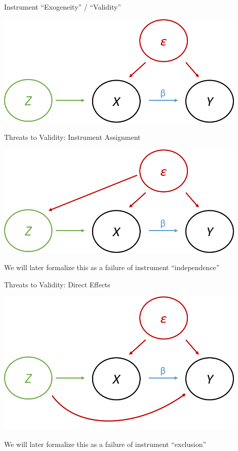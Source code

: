 \documentclass[11pt, english]{beamer}
\begin{document}
	\begin{frame}{Instrument ``Exogeneity'' / ``Validity''}
		\begin{center}
			\includegraphics[width=0.9\textwidth]{figures/dag3.png}
		\end{center}
	\end{frame}

	\begin{frame}{Threats to Validity: Instrument Assignment}
		\vspace{0.2cm}

		\begin{center}
			\includegraphics[width=0.9\textwidth]{figures/dag4.png}
		\end{center}
		We will later formalize this as a failure of instrument ``independence''
	\end{frame}

	\begin{frame}{Threats to Validity: Direct Effects}
		\vspace{0.2cm}

		\begin{center}
			\includegraphics[width=0.9\textwidth]{figures/dag5.png}
		\end{center}
		We will later formalize this as a failure of instrument ``exclusion''
	\end{frame}
\end{document}
